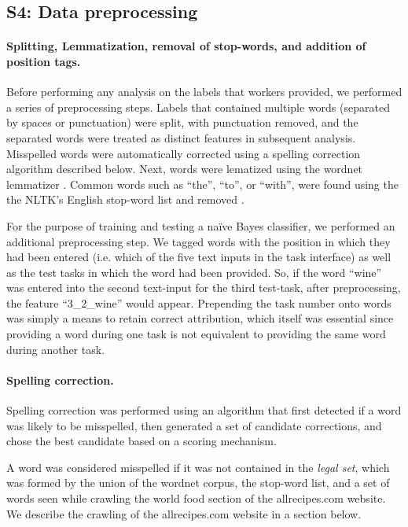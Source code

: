 \documentclass[12pt]{article}
\begin{document}
\subsection*{S4: Data preprocessing}
	\paragraph{Splitting, Lemmatization, removal of stop-words, and 
		addition of position tags.} 

	Before performing any analysis on the labels that workers provided, we
	performed a series of preprocessing steps.  
	Labels that contained
	multiple words (separated by spaces or punctuation) were split, with
	punctuation removed, and the separated words were treated as distinct 
	features in subsequent analysis.
	Misspelled words were automatically corrected using a spelling 
	correction algorithm described below.  
	Next, words were lematized using the
	wordnet lemmatizer \cite{miller1995wordnet,felbaum1998wordnet}.  
	Common words such as ``the'', ``to'', or ``with'', were found using the
	the NLTK's English stop-word list and removed \cite{loper2002nltk}.  

	For the purpose of training and testing a na\"ive Bayes classifier, we 
	performed an additional preprocessing step.  We tagged words with the
	position in which they had been entered (i.e. which of the five text 
	inputs in the task interface) as well as the test tasks in which the word 
	had been provided.
	So, if the word ``wine'' was entered into the second text-input for 
	the third test-task, after preprocessing, the feature ``3\_2\_wine'' would
	appear.  Prepending the task number onto words was simply a means to 
	retain correct attribution, which itself was essential since providing a
	word during one task is not equivalent to providing the same word during 
	another task.  
	
	\paragraph{Spelling correction.}  
	Spelling correction was performed using an algorithm that first detected
	if a word was likely to be misspelled, then generated a set of candidate 
	corrections, and chose the best candidate based on a scoring mechanism.
	
	A word was considered misspelled if it was not contained in the 
	\textit{legal set}, which was formed by the union of
	the wordnet corpus, the stop-word list, and a set of words seen while 
	crawling the world food section of the allrecipes.com website.  We
	describe the crawling of the allrecipes.com website in a section below.
\end{document}
